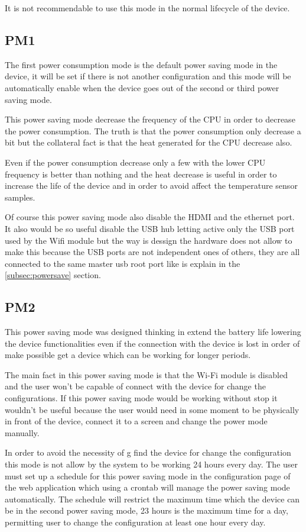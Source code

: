 		It is not recommendable to use this mode in the normal lifecycle of the device.
		\subsection{PM1}\label{sec:pm1}
		The first power consumption mode is the default power saving mode in the device, it will be set if there is not another configuration and this mode will be automatically enable when the device goes out of the second or third power saving mode.

		This power saving mode decrease the frequency of the CPU in order to decrease the power consumption. The truth is that the power consumption only decrease a bit but the collateral fact is that the heat generated for the CPU decrease also.

		Even if the power consumption decrease only a few with the lower CPU frequency is better than nothing and the heat decrease is useful in order to increase the life of the device and in order to avoid affect the temperature sensor samples.

		Of course this power saving mode also disable the HDMI and the ethernet port. It also would be so useful disable the USB hub letting active only the USB port used by the Wifi module but the way is dessign the hardware does not allow to make this because the USB ports are not independent ones of others, they are all connected to the same master usb root port like is explain in the \ref{subsec:powersave} section.

		\subsection{PM2}\label{sec:pm2}
		This power saving mode was designed thinking in extend the battery life lowering the device functionalities even if the connection with the device is lost in order of make possible get a device which can be working for longer periods.

		The main fact in this power saving mode is that the Wi-Fi module is disabled and the user won't be capable of connect with the device for change the configurations. If this power saving mode would be working without stop it wouldn't be useful because the user would need in some moment to be physically in front of the device, connect it to a screen and change the power mode manually.

		In order to avoid the necessity of g find the device for change the configuration this mode is not allow by the system to be working 24 hours every day. The user must set up a schedule for this power saving mode in the configuration page of the web application which using a crontab will manage the power saving mode automatically. The schedule will restrict the maximum time which the device can be in the second power saving mode, 23 hours is the maximum time for a day, permitting user to change the configuration at least one hour every day.

